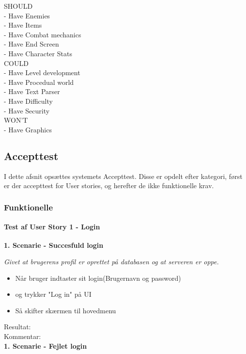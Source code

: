 SHOULD\\
  - Have Enemies\\
  - Have Items\\
  - Have Combat mechanics\\
  - Have End Screen\\
  - Have Character Stats\\

COULD\\
  - Have Level development\\
  - Have Procedual world\\
  - Have Text Parser\\
  - Have Difficulty\\
  - Have Security\\

WON'T\\
  - Have Graphics\\

\subsection{Accepttest}
I dette afsnit opsættes systemets Accepttest. Disse er opdelt efter kategori, først er der accepttest for User stories, og herefter de ikke funktionelle krav.

\subsubsection{Funktionelle}
\paragraph{Test af User Story 1 - Login}

\textbf{1. Scenarie - Succesfuld login}

\textit{Givet at brugerens profil er oprettet på databasen og at serveren er oppe.}

\begin{itemize}
  \item Når bruger indtaster sit login(Brugernavn og password)
  \item og trykker "Log in" på UI
  \item Så skifter skærmen til hovedmenu
\end{itemize}

Resultat:\\
Kommentar:\\

\textbf{1. Scenarie - Fejlet login}

